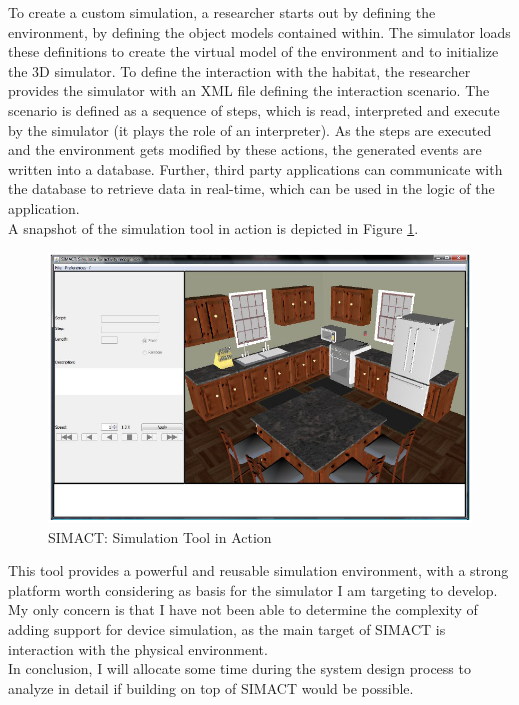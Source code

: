 To create a custom simulation, a researcher starts out by defining the environment, by defining the object models contained within. The simulator loads these definitions to create the virtual model of the environment and to initialize the 3D simulator. To define the interaction with the habitat, the researcher provides the simulator with an XML file defining the interaction scenario. The scenario is defined as a sequence of steps, which is read, interpreted and execute by the simulator (it plays the role of an interpreter). As the steps are executed and the environment gets modified by these actions, the generated events are written into a database. Further, third party applications can communicate with the database to retrieve data in real-time, which can be used in the logic of the application.\\

A snapshot of the simulation tool in action is depicted in Figure \ref{fig:simact_simulation_tool}.

\begin{figure}[H]
	\centering
	\includegraphics[width=\linewidth]{gfx/Chapter2/simact_simulation_tool}
	\caption{SIMACT: Simulation Tool in Action}
	\label{fig:simact_simulation_tool}
\end{figure}

This tool provides a powerful and reusable simulation environment, with a strong platform worth considering as basis for the simulator I am targeting to develop. My only concern is that I have not been able to determine the complexity of adding support for device simulation, as the main target of SIMACT is interaction with the physical environment.\\

In conclusion, I will allocate some time during the system design process to analyze in detail if building on top of SIMACT would be possible.

